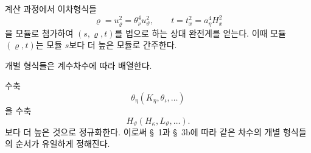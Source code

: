 
계산 과정에서 이차형식들
\[
\varrho=u_\varrho^2=\theta_\nu^4u_\vartheta^2,\qquad t=t_x^2=a_\eta^4H_x^2
\]
을 모듈로 첨가하여 $(s,\varrho,t)$를 법으로 하는 상대 완전계를 얻는다. 이때 모듈 $(\varrho,t)$는 모듈 $s$보다 더 높은 모듈로 간주한다.

개별 형식들은 계수차수에 따라 배열한다.

수축
\[
\theta_\eta(K_\eta,\theta_\iota,\ldots)
\]
을 수축
\[
H_\vartheta(H_\kappa,L_\vartheta,\ldots).
\]
보다 더 높은 것으로 정규화한다. 이로써 \S\ 1과 \S\ 3b에 따라 같은 차수의 개별 형식들의 순서가 유일하게 정해진다.
